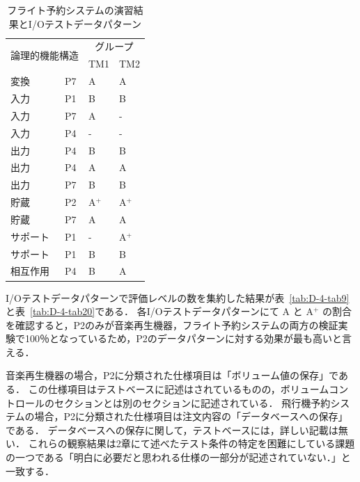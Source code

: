 \begin{table}[htbp]
  \centering
\caption{フライト予約システムの演習結果とI/Oテストデータパターン}
    \begin{tabular}{|l|l|l|l|}
    \hline
    \multicolumn{2}{|c|}{\multirow{2}[4]{*}{論理的機能構造}} & \multicolumn{2}{c|}{グループ} \bigstrut\\
\cline{3-4}    \multicolumn{2}{|c|}{} & TM1   & TM2 \bigstrut\\
    \hline
    \hline
    変換 & P7    & A     & A \bigstrut\\
    \hline
    入力 & P1    & B     & B \bigstrut\\
    \hline
    入力 & P7    & A     & - \bigstrut\\
    \hline
    入力 & P4    & -     & - \bigstrut\\
    \hline
    出力 & P4    & B     & B \bigstrut\\
    \hline
    出力 & P4    & A     & A \bigstrut\\
    \hline
    出力 & P7    & B     & B \bigstrut\\
    \hline
    貯蔵 & P2    & A${}^\text{+}$    & A${}^\text{+}$ \bigstrut\\
    \hline
    貯蔵 & P7    & A     & A \bigstrut\\
    \hline
    サポート & P1    & -     & A${}^\text{+}$ \bigstrut\\
    \hline
    サポート & P1    & B     & B \bigstrut\\
    \hline
    相互作用 & P4    & B     & A \bigstrut\\
    \hline
    \end{tabular}%
\label{tab:D-4-tab8}%
\end{table}%

I/Oテストデータパターンで評価レベルの数を集約した結果が表~\ref{tab:D-4-tab9}と表~\ref{tab:D-4-tab20}である．
各I/Oテストデータパターンにて A と A${}^\text{+}$ の割合を確認すると，P2のみが音楽再生機器，フライト予約システムの両方の検証実験で100％となっているため，P2のデータパターンに対する効果が最も高いと言える．

音楽再生機器の場合，P2に分類された仕様項目は「ボリューム値の保存」である．
この仕様項目はテストベースに記述はされているものの，ボリュームコントロールのセクションとは別のセクションに記述されている．
飛行機予約システムの場合，P2に分類された仕様項目は注文内容の「データベースへの保存」である．
データベースへの保存に関して，テストベースには，詳しい記載は無い．
これらの観察結果は2章にて述べたテスト条件の特定を困難にしている課題の一つである「明白に必要だと思われる仕様の一部分が記述されていない．」と一致する．

